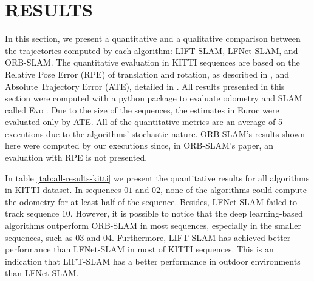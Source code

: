 \documentclass[a4paper, 10pt, conference]{ieeeconf}      %
\begin{document}
\section{RESULTS}

In this section, we present a quantitative and a qualitative comparison between the trajectories computed by each algorithm: LIFT-SLAM, LFNet-SLAM, and ORB-SLAM. The quantitative evaluation in KITTI sequences are based on the Relative Pose Error (RPE) of translation and rotation, as described in \cite{kitti-benchmark}, and Absolute Trajectory Error (ATE), detailed in \cite{tum-vi}. All results presented in this section were computed with a python package to evaluate odometry and SLAM called Evo \cite{evo}. Due to the size of the sequences, the estimates in Euroc were evaluated only by ATE. All of the quantitative metrics are an average of 5 executions due to the algorithms' stochastic nature. ORB-SLAM's results shown here were computed by our executions since, in ORB-SLAM's paper, an evaluation with RPE is not presented.


In table \ref{tab:all-results-kitti} we present the quantitative results for all algorithms in KITTI dataset. In sequences $01$ and $02$, none of the algorithms could compute the odometry for at least half of the sequence. Besides, LFNet-SLAM failed to track sequence $10$. However, it is possible to notice that the deep learning-based algorithms outperform ORB-SLAM in most sequences, especially in the smaller sequences, such as $03$ and $04$. Furthermore, LIFT-SLAM has achieved better performance than LFNet-SLAM in most of KITTI sequences. This is an indication that LIFT-SLAM has a better performance in outdoor environments than LFNet-SLAM.
\end{document}
